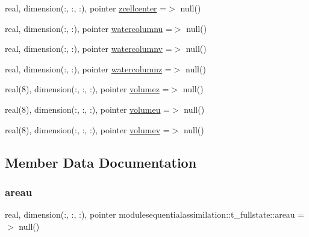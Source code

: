 \begin{DoxyCompactItemize}
\item 
real, dimension(\+:, \+:, \+:), pointer \mbox{\hyperlink{structmodulesequentialassimilation_1_1t__fullstate_a08e523941c66f7e62a5bb03c5284e840}{zcellcenter}} =$>$ null()
\item 
real, dimension(\+:, \+:), pointer \mbox{\hyperlink{structmodulesequentialassimilation_1_1t__fullstate_a15644f178cd2e6222d14207b1381cb94}{watercolumnu}} =$>$ null()
\item 
real, dimension(\+:, \+:), pointer \mbox{\hyperlink{structmodulesequentialassimilation_1_1t__fullstate_a8ab46c169a9f352e4b4819869f9d99e2}{watercolumnv}} =$>$ null()
\item 
real, dimension(\+:, \+:), pointer \mbox{\hyperlink{structmodulesequentialassimilation_1_1t__fullstate_a194f1f75787106a28a4deb7938dfe6e1}{watercolumnz}} =$>$ null()
\item 
real(8), dimension(\+:, \+:, \+:), pointer \mbox{\hyperlink{structmodulesequentialassimilation_1_1t__fullstate_a7f95179394323b2793b5340737c2a11f}{volumez}} =$>$ null()
\item 
real(8), dimension(\+:, \+:, \+:), pointer \mbox{\hyperlink{structmodulesequentialassimilation_1_1t__fullstate_ab23c766d5017f0200843c47dd099c3e9}{volumeu}} =$>$ null()
\item 
real(8), dimension(\+:, \+:, \+:), pointer \mbox{\hyperlink{structmodulesequentialassimilation_1_1t__fullstate_ab308002b19810ed40b852e93b48c9bef}{volumev}} =$>$ null()
\end{DoxyCompactItemize}


\subsection{Member Data Documentation}
\mbox{\label{structmodulesequentialassimilation_1_1t__fullstate_aeae0ea6aabb4a16717d5c4dd1f14fb55}} 
\subsubsection{\texorpdfstring{areau}{areau}}
{\footnotesize\ttfamily real, dimension(\+:, \+:, \+:), pointer modulesequentialassimilation\+::t\+\_\+fullstate\+::areau =$>$ null()\hspace{0.3cm}{\ttfamily [private]}}

